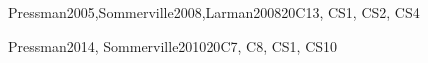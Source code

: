 \begin{syllabus}
\begin{unit}{\SESoftwareVerificationandValidation}{}{Pressman2005,Sommerville2008,Larman2008}{20}{C13, CS1, CS2, CS4}
\begin{learningoutcomes}
		\item \SESoftwareVerificationandValidationLODiscussTheTesting [\Familiarity] %
		\item \SESoftwareVerificationandValidationLOEvaluateAFor [\Usage] %
		\item \SESoftwareVerificationandValidationLOCompareStatic [\Familiarity] %
		\item \SESoftwareVerificationandValidationLOIdentifyTheOfDevelopment [\Familiarity] %
		\item \SESoftwareVerificationandValidationLODiscussTheThe [\Usage] %
		\item \SESoftwareVerificationandValidationLODescribeTechniquesVerification [\Familiarity] %
		\item \SESoftwareVerificationandValidationLODescribeApproachesEstimation [\Familiarity] %
		\item \SESoftwareVerificationandValidationLOEstimateThe [\Usage] %
		\item \SESoftwareVerificationandValidationLOConductAn [\Usage] %
	\end{learningoutcomes}
\end{unit}

\begin{unit}{\SEToolsandEnvironments}{}{Pressman2014, Sommerville2010}{20}{C7, C8, CS1, CS10}
	\begin{topics}
		\item \SEToolsandEnvironmentsTopicSoftware
		\item \SEToolsandEnvironmentsTopicRelease
		\item \SEToolsandEnvironmentsTopicRequierements
		\item \SEToolsandEnvironmentsTopicTesting
		\item \SEToolsandEnvironmentsTopicProgramming
		\item \SEToolsandEnvironmentsTopicTool
	\end{topics}
	\begin{learningoutcomes}%
		\item \SEToolsandEnvironmentsLODescribeTheCentralized
		\item \SEToolsandEnvironmentsLODescribeHowCanToK
		\item \SEToolsandEnvironmentsLOIdentifyConfiguration
		\item \SEToolsandEnvironmentsLODescribeHowAnd
		\item \SEToolsandEnvironmentsLODescribeTheAre
		\item \SEToolsandEnvironmentsLODemonstrateTheUse
	\end{learningoutcomes}
\end{unit}

\begin{coursebibliography}
\end{coursebibliography}

\end{syllabus}
